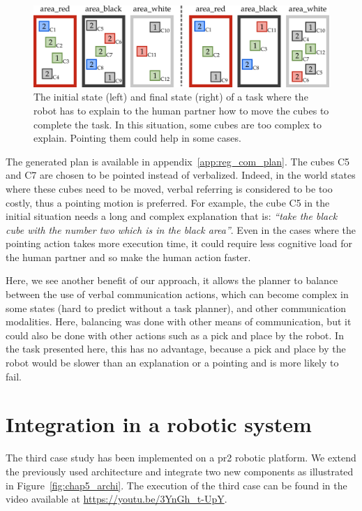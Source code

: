 \begin{figure}[!ht]
\centering
\includegraphics[width=\textwidth]{figures/chapter5/results_case3.png}
\caption{\label{fig:chap5_case3} The initial state (left) and final state (right) of a task where the robot has to explain to the human partner how to move the cubes to complete the task. In this situation, some cubes are too complex to explain. Pointing them could help in some cases. }
\end{figure}
 
The generated plan is available in appendix~\ref{app:reg_com_plan}. The cubes C5 and C7 are chosen to be pointed instead of verbalized. Indeed, in the world states where these cubes need to be moved, verbal referring is considered to be too costly, thus a pointing motion is preferred. For example, the cube C5 in the initial situation needs a long and complex explanation that is: \textit{``take the black cube with the number two which is in the black area''}. Even in the cases where the pointing action takes more execution time, it could require less cognitive load for the human partner and so make the human action faster.

Here, we see another benefit of our approach, it allows the planner to balance between the use of verbal communication actions, which can become complex in some states (hard to predict without a task planner), and other communication modalities. Here, balancing was done with other means of communication, but it could also be done with other actions such as a pick and place by the robot. In the task presented here, this has no advantage, because a pick and place by the robot would be slower than an explanation or a pointing and is more likely to fail.

\section{Integration in a robotic system}

The third case study has been implemented on a pr2 robotic platform. We extend the previously used architecture and integrate two new components as illustrated in Figure~\ref{fig:chap5_archi}. The execution of the third case can be found in the video available at \url{https://youtu.be/3YnGh_t-UpY}.

